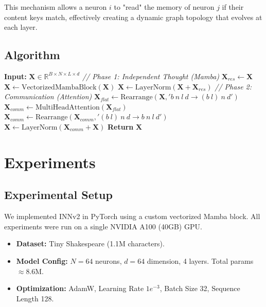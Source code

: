 \documentclass[a4paper,11pt]{article}
\newcommand{\Real}{\mathbb{R}}
\begin{document}
This mechanism allows a neuron $i$ to "read" the memory of neuron $j$ if their content keys match, effectively creating a dynamic graph topology that evolves at each layer.

\subsection{Algorithm}

\begin{algorithm}[H]
\caption{Forward Pass of INNv2 Layer}
\begin{algorithmic}[1]
\STATE \textbf{Input:} $\mathbf{X} \in \Real^{B \times N \times L \times d}$
\STATE \textit{// Phase 1: Independent Thought (Mamba)}
\STATE $\mathbf{X}_{res} \leftarrow \mathbf{X}$
\STATE $\mathbf{X} \leftarrow \text{VectorizedMambaBlock}(\mathbf{X})$ 
\STATE $\mathbf{X} \leftarrow \text{LayerNorm}(\mathbf{X} + \mathbf{X}_{res})$
\STATE \textit{// Phase 2: Communication (Attention)}
\STATE $\mathbf{X}_{flat} \leftarrow \text{Rearrange}(\mathbf{X}, 'b\ n\ l\ d \to (b\ l)\ n\ d')$
\STATE $\mathbf{X}_{comm} \leftarrow \text{MultiHeadAttention}(\mathbf{X}_{flat})$ 
\STATE $\mathbf{X}_{comm} \leftarrow \text{Rearrange}(\mathbf{X}_{comm}, '(b\ l)\ n\ d \to b\ n\ l\ d')$
\STATE $\mathbf{X} \leftarrow \text{LayerNorm}(\mathbf{X}_{comm} + \mathbf{X})$
\STATE \textbf{Return} $\mathbf{X}$
\end{algorithmic}
\end{algorithm}

\section{Experiments}

\subsection{Experimental Setup}
We implemented INNv2 in PyTorch using a custom vectorized Mamba block. All experiments were run on a single NVIDIA A100 (40GB) GPU.
\begin{itemize}
    \item \textbf{Dataset:} Tiny Shakespeare (1.1M characters).
    \item \textbf{Model Config:} $N=64$ neurons, $d=64$ dimension, 4 layers. Total params $\approx 8.6$M.
    \item \textbf{Optimization:} AdamW, Learning Rate $1e^{-3}$, Batch Size 32, Sequence Length 128.
\end{itemize}
\end{document}
